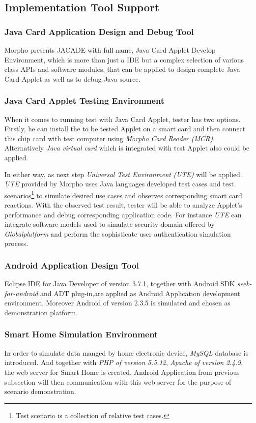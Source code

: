 \subsection{Implementation Tool Support}
\subsubsection{Java Card Application Design and Debug Tool}
Morpho presents JACADE with full name, Java Card Applet Develop Environment, which is more than just a IDE but a complex selection of various class APIs and software modules, that can be applied to design complete Java Card Applet as well as to debug Java source. 
\subsubsection{Java Card Applet Testing Environment}
When it comes to running test with Java Card Applet, tester has two options. Firstly, he can install the to be tested Applet on a smart card and then connect this chip card with test computer using \emph{Morpho Card Reader (MCR)}. Alternatively \emph{Java virtual card} which is integrated with test Applet also could be applied. 

In either way, as next step \emph{Universal Test Environment (UTE)} will be applied. \emph{UTE} provided by Morpho uses Java languages developed test cases
 and test scenarios\footnote{Test scenario is a collection of relative test cases.} to simulate desired use cases and observes corresponding smart card reactions. With the observed test result, tester will be able to analyze Applet's performance and debug corresponding application code. For instance \emph{UTE} can integrate software models used to simulate security domain offered by \emph{Globalplatform} and perform the sophisticate user authentication simulation process.
\subsubsection{Android Application Design Tool}
Eclipse IDE for Java Developer of version 3.7.1, together with Android SDK \emph{seek-for-android} and ADT plug-in,are applied as Android Application development environment. Moreover Android of version 2.3.5 is simulated and chosen as demonstration platform.
\subsubsection{Smart Home Simulation Environment}
In order to simulate data manged by home electronic device, \emph{MySQL} database is introduced. And together with \emph{PHP of version 5.5.12}, \emph{Apache of version 2.4.9}, the web server for Smart Home is created. Android Application from previous subsection will then communication with this web server for the purpose of scenario demonstration.